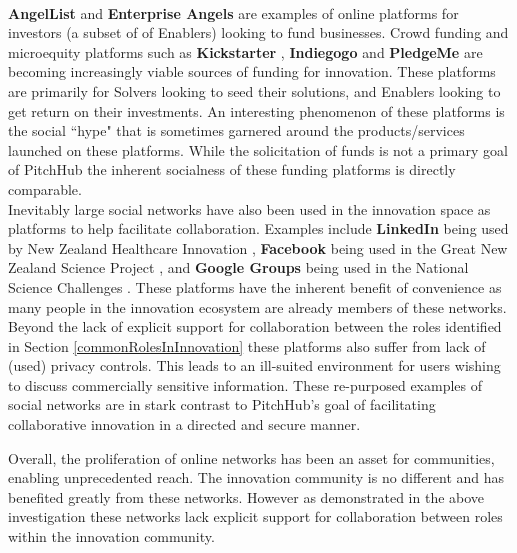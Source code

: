 \\
\newline
\textbf{AngelList} \cite{Angel:online} and \textbf{Enterprise Angels} \cite{enterpriseAngles:online} are examples of online platforms for investors (a subset of of Enablers) looking to fund businesses. Crowd funding and microequity platforms such as \textbf{Kickstarter} \cite{Kicks6:online}, \textbf{Indiegogo} \cite{Indie3:online} and \textbf{PledgeMe} \cite{Pledge:online} are becoming increasingly viable sources of funding for innovation. These platforms are primarily for Solvers looking to seed their solutions, and Enablers looking to get return on their investments. An interesting phenomenon of these platforms is the social ``hype" that is sometimes garnered around the products/services launched on these platforms. While the solicitation of funds is not a primary goal of PitchHub the inherent socialness of these funding platforms is directly comparable.
\\
\newline
Inevitably large social networks have also been used in the innovation space as platforms to help facilitate collaboration. Examples include \textbf{LinkedIn} \cite{Linkedin:online} being used by New Zealand Healthcare Innovation \cite{nzHealthCare:online}, \textbf{Facebook} \cite{Faceb6:online} being used in the Great New Zealand Science Project \cite{greatNZScience:online}, and \textbf{Google Groups} \cite{Googlegroups:online} being used in the National Science Challenges \cite{nzNSC10:online}. These platforms have the inherent benefit of convenience as many people in the innovation ecosystem are already members of these networks. Beyond the lack of explicit support for collaboration between the roles identified in Section \ref{commonRolesInInnovation} these platforms also suffer from lack of (used) privacy controls. This leads to an ill-suited environment for users wishing to discuss commercially sensitive information. These re-purposed examples of social networks are in stark contrast to PitchHub's goal of facilitating collaborative innovation in a directed and secure manner.

Overall, the proliferation of online networks has been an asset for communities, enabling unprecedented reach. The innovation community is no different and has benefited greatly from these networks. However as demonstrated in the above investigation these networks lack explicit support for collaboration between roles within the innovation community.
